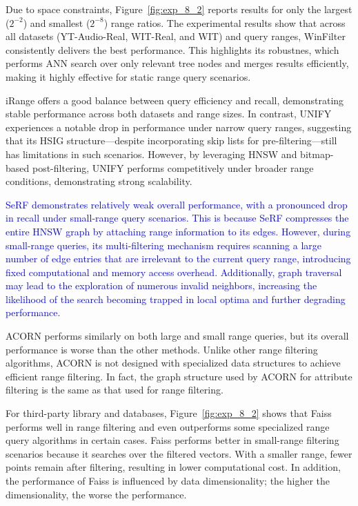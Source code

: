 \documentclass[sigconf, nonacm]{acmart}
\begin{document}
	Due to space constraints, Figure~\ref{fig:exp_8_2} reports results for only the largest ($2^{-2}$) and smallest ($2^{-8}$) range ratios. The experimental results show that across all datasets (YT-Audio-Real, WIT-Real, and WIT) and query ranges, WinFilter consistently delivers the best performance. This highlights its robustnes, which performs ANN search over only relevant tree nodes and merges results efficiently, making it highly effective for static range query scenarios.
	
	iRange offers a good balance between query efficiency and recall, demonstrating stable performance across both datasets and range sizes. In contrast, UNIFY experiences a notable drop in performance under narrow query ranges, suggesting that its HSIG structure—despite incorporating skip lists for pre-filtering—still has limitations in such scenarios. However, by leveraging HNSW and bitmap-based post-filtering, UNIFY performs competitively under broader range conditions, demonstrating strong scalability.
	

	\textcolor{blue}{SeRF demonstrates relatively weak overall performance, with a pronounced drop in recall under small-range query scenarios. This is because SeRF compresses the entire HNSW graph by attaching range information to its edges. However, during small-range queries, its multi-filtering mechanism requires scanning a large number of edge entries that are irrelevant to the current query range, introducing fixed computational and memory access overhead. Additionally, graph traversal may lead to the exploration of numerous invalid neighbors, increasing the likelihood of the search becoming trapped in local optima and further degrading performance.
	}
	
	ACORN performs similarly on both large and small range queries, but its overall performance is worse than the other methods. Unlike other range filtering algorithms, ACORN is not designed with specialized data structures  to achieve efficient range filtering. In fact, the graph structure used by ACORN for attribute filtering is the same as that used for range filtering.
	
	For third-party library and databases, Figure~\ref{fig:exp_8_2} shows that Faiss performs well in range filtering and even outperforms some specialized range query algorithms in certain cases. 
	Faiss performs better in small-range filtering scenarios because it searches over the filtered vectors. With a smaller range, fewer points remain after filtering, resulting in lower computational cost. In addition, the performance of Faiss is influenced by data dimensionality; the higher the dimensionality, the worse the performance.
	
\end{document}
